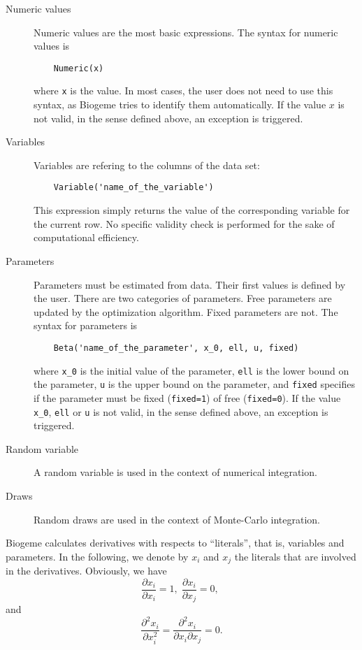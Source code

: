 \documentclass[12pt,a4paper]{article}
\begin{document}
\begin{description}
\item[Numeric values] Numeric values are the most basic expressions. The syntax for numeric values is
  \begin{lstlisting}
    Numeric(x)
  \end{lstlisting}
  where \lstinline+x+ is the value. In most cases, the user does not need to use this syntax, as Biogeme tries to identify them automatically.
  If the value $x$ is not valid, in the sense defined above, an exception is triggered.
\item[Variables] Variables are refering to the columns of the data set:
  \begin{lstlisting}
    Variable('name_of_the_variable')
  \end{lstlisting}
  This expression simply returns the value of the corresponding variable for the current row. No specific validity check is performed for the sake of computational efficiency.
\item[Parameters] Parameters must be estimated from data. Their first values is defined by the user. There are two categories of parameters. Free parameters are updated by the optimization algorithm.
  Fixed parameters are not.
  The syntax for parameters is
  \begin{lstlisting}
    Beta('name_of_the_parameter', x_0, ell, u, fixed)
  \end{lstlisting}
  where \lstinline+x_0+ is the initial value of the parameter,
  \lstinline+ell+ is the lower bound on the parameter, \lstinline+u+ is the upper bound on the parameter, and \lstinline+fixed+ specifies if the parameter must be fixed (\lstinline+fixed=1+) of free (\lstinline+fixed=0+).
  If the value \lstinline+x_0+, \lstinline+ell+ or \lstinline+u+  is not valid, in the sense defined above, an exception is triggered.
\item[Random variable] A random variable is used in the context of numerical integration.
\item[Draws] Random draws are used in the context of Monte-Carlo integration. 

\end{description}

Biogeme calculates derivatives with respects to ``literals'', that is, variables and parameters. In the following, we denote by $x_i$ and $x_j$ the literals that are involved in the derivatives.
Obviously, we have
\[
\frac{\partial x_i}{\partial x_i}=1, \;
\frac{\partial x_i}{\partial x_j}=0, \;
\]
and
\[
\frac{\partial^2 x_i}{\partial x_i^2}=\frac{\partial^2 x_i}{\partial x_i \partial x_j} = 0. 
\]
\end{document}
